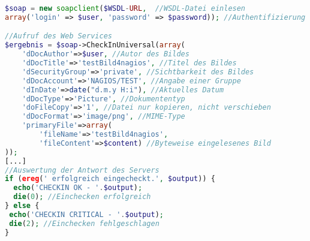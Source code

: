 \begin{lstlisting}[captionpos=b, caption=Aufruf des Web Services CheckInUniversal, label=1stplugin, breaklines = true, language=PHP]
$soap = new soapclient($WSDL-URL,  //WSDL-Datei einlesen 
array('login' => $user, 'password' => $password)); //Authentifizierung am Oracle UCM-Server

//Aufruf des Web Services
$ergebnis = $soap->CheckInUniversal(array(
	'dDocAuthor'=>$user, //Autor des Bildes
	'dDocTitle'=>'testBild4nagios', //Titel des Bildes
	'dSecurityGroup'=>'private', //Sichtbarkeit des Bildes
	'dDocAccount'=>'NAGIOS/TEST', //Angabe einer Gruppe
	'dInDate'=>date("d.m.y H:i"), //Aktuelles Datum
	'dDocType'=>'Picture', //Dokumententyp
	'doFileCopy'=>'1', //Datei nur kopieren, nicht verschieben
	'dDocFormat'=>'image/png', //MIME-Type
	'primaryFile'=>array(
		'fileName'=>'testBild4nagios',
 		'fileContent'=>$content) //Byteweise eingelesenes Bild
));
[...]
//Auswertung der Antwort des Servers
if (ereg(' erfolgreich eingecheckt.', $output)) {
  echo('CHECKIN OK - '.$output);
  die(0); //Einchecken erfolgreich
} else {
 echo('CHECKIN CRITICAL - '.$output);
 die(2); //Einchecken fehlgeschlagen
}
\end{lstlisting}